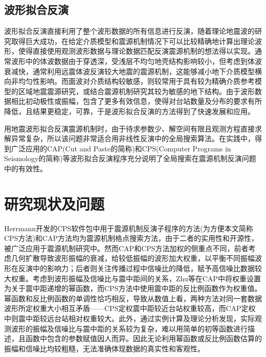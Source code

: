 \subsection{波形拟合反演}

波形拟合反演直接利用了整个波形数据的所有信息进行反演，随着理论地震波的研究取得巨大成功\citep{Haskell1964,Herrmann1979,Wang1980}，在给定介质模型和震源机制情况下可以比较精确地计算出理论波形，使得直接使用观测波形数据与理论数据匹配反演震源机制的想法得以实现。通常波形中的体波数据由于穿透深，受浅层不均匀地壳结构影响较小，但考虑到体波衰减快，通常利用远震体波反演较大地震的震源机制，这能够减小地下介质模型横向非均匀性影响。而面波对介质结构较敏感，则较常用于具有较为精确介质参考模型的区域地震震源研究，或结合震源机制研究其较为敏感的地下结构\citep{Nolet1990}。由于波形数据相比初动极性或振幅，包含了更多有效信息，使得对台站数量及分布的要求有所降低，且结果更稳定，可靠，于是波形拟合反演的方法得到了快速发展和应用\citep{Walter1993,Ritsema1993,Zhao1994,Nabvelek1995}。

用地震波形拟合反演震源机制时，由于待求参数少、解空间有限且观测方程直接求解异常复杂，所以该问题非常适合用非线性反演中的全局搜索算法。在实践中，得到广泛应用的CAP(Cut and Paste的简称)\citep{Zhao1994,Zhu1996,Tan2006}和CPS(Computer Programs in Seismology的简称)\citep{Herrmann1989}等波形拟合反演程序充分说明了全局搜索在震源机制反演问题中的有效性。

\section{研究现状及问题}

Herrmann开发的CPS软件包中用于震源机制反演子程序的方法\citep{Herrmann1989}(为方便本文简称CPS方法)和CAP方法\citep{Zhao1994,Zhu1996,Tan2006}均为震源机制格点搜索方法，由于二者的实用性和开源性，被广泛应用于震源机制研究中。然而CAP和CPS方法加权的侧重点不同，前者考虑几何扩散导致波形振幅的衰减，给较低振幅的波形加大权重，以平衡不同振幅波形在反演中的影响力；后者则关注传播过程中信噪比的降低，赋予高信噪比数据较大权重。考虑到波形振幅及信噪比与震中距间的关系，Zhu等\citep{Zhu1996}在CAP中将权重设置为关于震中距递增的幂函数，而CPS方法中使用震中距的反比例函数作为权重值。幂函数和反比例函数的单调性恰巧相反，导致从数值上看，两种方法对同一套数据波形所定权重大小相互矛盾——CPS定权震中距较近台站权重较高，而CAP定权中则震中距较远台站相对权重较大。此外，通过实例计算及理论分析发现，实际观测波形的振幅及信噪比与震中距的关系较为复杂，难以用简单的初等函数进行描述，且函数中包含的参数赋值因人而异。因此无论利用幂函数或反比例函数估算的振幅和信噪比均较粗糙，无法准确体现数据的真实性和客观性。

